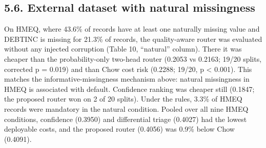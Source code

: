 \documentclass[
  11pt,
]{article}
\begin{document}
\hypertarget{external-dataset-with-natural-missingness}{%
\subsection{5.6. External dataset with natural
missingness}\label{external-dataset-with-natural-missingness}}

On HMEQ, where 43.6\% of records have at least one naturally missing
value and DEBTINC is missing for 21.3\% of records, the quality-aware
router was evaluated without any injected corruption (Table 10,
``natural'' column). There it was cheaper than the probability-only
two-head router (0.2053 vs 0.2163; 19/20 splits, corrected p = 0.019)
and than Chow cost risk (0.2288; 19/20, p \textless{} 0.001). This
matches the informative-missingness mechanism above: natural missingness
in HMEQ is associated with default. Confidence ranking was cheaper still
(0.1847; the proposed router won on 2 of 20 splits). Under the rules,
3.3\% of HMEQ records were mandatory in the natural condition. Pooled
over all nine HMEQ conditions, confidence (0.3950) and differential
triage (0.4027) had the lowest deployable costs, and the proposed router
(0.4056) was 0.9\% below Chow (0.4091).
\end{document}
